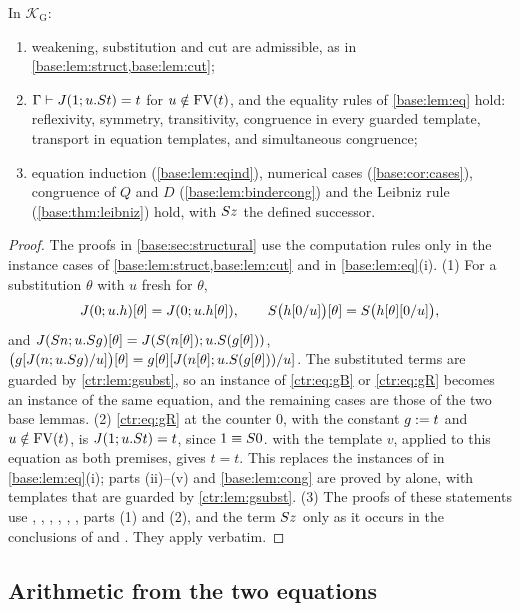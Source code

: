 \begin{lemma}\label{ctr:lem:gstruct}
In $\mathcal K_{\mathrm G}$:
\begin{enumerate}
\item weakening, substitution and cut are admissible, as in \cref{base:lem:struct,base:lem:cut};
\item $\Gamma\vdash J(1;u.S t)=t$ for $u\notin\operatorname{FV}(t)$, and the equality rules of
\cref{base:lem:eq} hold: reflexivity, symmetry, transitivity, congruence in every guarded
template, transport in equation templates, and simultaneous congruence;
\item equation induction (\cref{base:lem:eqind}), numerical cases (\cref{base:cor:cases}),
congruence of $Q$ and $D$ (\cref{base:lem:bindercong}) and the Leibniz rule
(\cref{base:thm:leibniz}) hold, with $S z$ the defined successor.
\end{enumerate}
\end{lemma}
\begin{proof}
The proofs in \cref{base:sec:structural} use the computation rules only in the instance
cases of \cref{base:lem:struct,base:lem:cut} and in \cref{base:lem:eq}(i). (1) For a
substitution $\theta$ with $u$ fresh for $\theta$,
\[
 J(0;u.h)[\theta]=J(0;u.h[\theta]),\qquad S\bigl(h[0/u]\bigr)[\theta]=
 S\bigl(h[\theta][0/u]\bigr),
\]
and $J(S n;u.S g)[\theta]=J(S(n[\theta]);u.S(g[\theta]))$,
$\bigl(g[J(n;u.S g)/u]\bigr)[\theta]
=g[\theta][J(n[\theta];u.S(g[\theta]))/u]$. The substituted terms are guarded by
\cref{ctr:lem:gsubst}, so an instance of \eqref{ctr:eq:gB} or \eqref{ctr:eq:gR} becomes an
instance of the same equation, and the remaining cases are those of the two base lemmas.
(2) \eqref{ctr:eq:gR} at the counter $0$, with the constant $g\mathrel{:=} t$ and $u\notin\operatorname{FV}(t)$,
is $J(1;u.S t)=t$, since $1\equiv S 0$.  with the template $v$, applied to
this equation as both premises, gives $t=t$. This replaces the instances of 
in \cref{base:lem:eq}(i); parts (ii)--(v) and \cref{base:lem:cong} are proved by
 alone, with templates that are guarded by \cref{ctr:lem:gsubst}. (3) The proofs
of these statements use , , , ,
, , parts (1) and (2), and the term $S z$ only as it occurs in
the conclusions of  and . They apply verbatim.
\end{proof}

\subsection{Arithmetic from the two equations}

